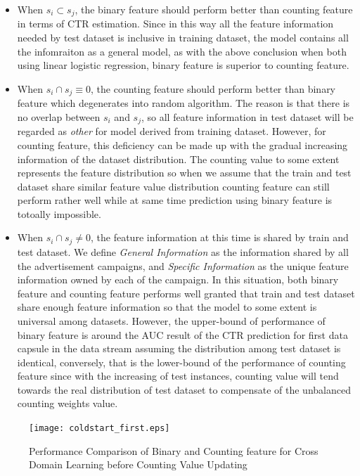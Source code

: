 \begin{itemize}
\item When \(s_i \subset s_j\), the binary feature should perform better than counting feature in terms of CTR estimation. Since in this way all the feature information needed by test dataset is inclusive in training dataset, the model contains all the infomraiton as a general model, as with the above conclusion when both using linear logistic regression, binary feature is superior to counting feature.  
\item When \(s_i \cap s_j \equiv 0\), the counting feature should perform better than binary feature which degenerates into random algorithm. The reason is that there is no overlap between \(s_i\) and \(s_j\), so all feature information in test dataset will be regarded as \textit{other} for model derived from training dataset. However, for counting feature, this deficiency can be made up with the gradual increasing information of the dataset distribution. The counting value to some extent represents the feature distribution so when we assume that the train and test dataset share similar feature value distribution counting feature can still perform rather well while at same time prediction using binary feature is totoally impossible.
\item When \(s_i \cap s_j \neq 0\), the feature information at this time is shared by train and test dataset. We define \textit{General Information} as the information shared by all the advertisement campaigns, and \textit{Specific Information} as the unique feature information owned by each of the campaign. In this situation, both binary feature and counting feature performs well granted that train and test dataset share enough feature information so that the model to some extent is universal among datasets. However, the upper-bound of performance of binary feature is around the AUC result of the CTR prediction for first data capsule in the data stream assuming the distribution among test dataset is identical, conversely, that is the lower-bound of the performance of counting feature since with the increasing of test instances, counting value will tend towards the real distribution of test dataset to compensate of the unbalanced counting weights value. 
\end{itemize}



\begin{figure}[t]
\centering
\texttt{[image: coldstart\_first.eps]}
\caption{Performance Comparison of Binary and Counting feature for Cross Domain Learning before Counting Value Updating}
\label{fig:coldstart_first}
\end{figure}

